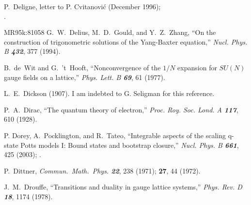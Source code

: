 

 P.~Deligne,
    letter to P. Cvitanovi\'c (December 1996);
    \\
    .


        {MR95k:81058} G.~W.~Delius, M.~D.~Gould, and Y.~Z.~Zhang,
    ``On the construction of
      trigonometric solutions of the Yang-Baxter equation,''
    {\em Nucl. Phys. B  \bf 432}, 377 (1994). %

 B.~de~Wit and G.~'t~Hooft,
``Nonconvergence of the $1/N$ expansion for
  $SU(N)$ gauge fields on a lattice,''
    {\em Phys.  Lett.  B  \bf 69}, 61 (1977).

 L.~E.~Dickson (1907).
I am indebted to G.  Seligman for this reference.

P.~A.~Dirac,
``The quantum theory of electron,''
{\em Proc.  Roy.  Soc.  Lond.    A \bf 117}, 610 (1928).

 P. Dorey, A.~Pocklington, and  R.~Tateo,
    ``Integrable aspects of the scaling q-state Potts models I:
    Bound states and bootstrap closure,''
    {\em Nucl. Phys. B \bf 661},  425 (2003); %
    .

P.~Dittner,
{\em Commun.~Math.~Phys.  \bf 22}, 238 (1971); {\bf 27}, 44 (1972).

J.~M.~Drouffe,
``Transitions and duality in gauge lattice systems,''
{\em Phys.  Rev.    D \bf  18}, 1174 (1978).

